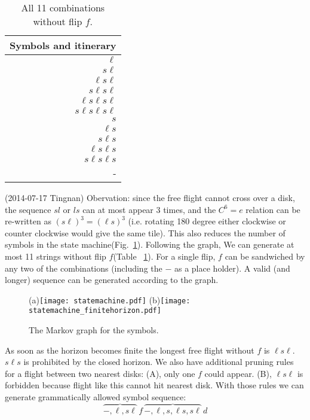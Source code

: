 \begin{table}
\begin{center}
\begin{tabular}{r}
Symbols and itinerary \\\hline
$\ell$  \\
$s\ell$ \\
$\ell s \ell$ \\
$s \ell s \ell$ \\
$\ell s \ell s \ell$ \\
$s\ell s \ell s \ell$ \\
$s$  \\
$\ell s$ \\
$s \ell s $ \\
$\ell s \ell s$ \\
$s \ell s \ell s$ \\
- \\\hline
\end{tabular}
\end{center}
\caption{All 11 combinations without flip $f$. }
\label{tab:11slcombos}
\end{table}
(2014-07-17 Tingnan) Obervation: since the free flight cannot cross over a disk, the sequence $sl$ or $ls$ can at most appear 3 times, and the $C^6=e$ relation can be re-written as $(s\ell)^3=(\ell s)^3$ (i.e. rotating 180 degree either clockwise or counter clockwise would give the same tile). This also reduces the number of symbols in the state machine(Fig.~\ref{fig:statemachine}). Following the graph, We can generate at most 11 strings without flip $f$(Table ~\ref{tab:11slcombos}). For a single flip, $f$ can be sandwiched by
any two of the combinations (including the $-$ as a place holder). A valid (and longer) sequence can be generated according to the graph.
\begin{figure}
(a)\texttt{[image: statemachine.pdf]}
(b)\texttt{[image: statemachine\_finitehorizon.pdf]}
\caption{\label{fig:statemachine} The Markov graph for the symbols.
}
\end{figure}

As soon as the horizon becomes finite the longest free flight without $f$
is $\ell s \ell$. $s \ell s$ is prohibited by the closed horizon. We also
have additional pruning rules for a flight between two nearest disks:
(A), only one $f$ could appear. (B), $ \ell s \ell $ is forbidden because
flight like this cannot hit nearest disk. With those rules we can
generate grammatically allowed symbol sequence:
\[
\overbrace{-,\ell,s\ell}\, f\,\overbrace{-,\ell,s,\ell s, s\ell}\, d
\]


